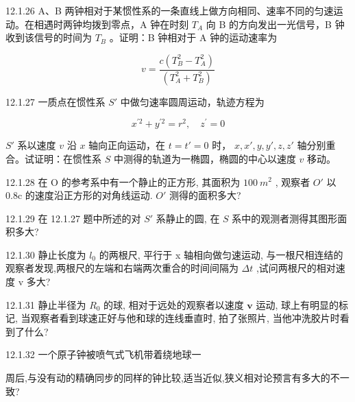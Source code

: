 \begin{problem}{12.1.26}
A、B 两钟相对于某惯性系的一条直线上做方向相同、速率不同的匀速运动。在相遇时两钟均拨到零点，A 钟在时刻 $T_{A}$ 向 B 的方向发出一光信号，B 钟收到该信号的时间为 $T_{B}$ 。证明：B 钟相对于 A 钟的运动速率为

\[
v = \frac {c (T _ {B} ^ {2} - T _ {A} ^ {2})}{(T _ {A} ^ {2} + T _ {B} ^ {2})}
\]
\end{problem}
\clearpage


\begin{problem}{12.1.27}
一质点在惯性系 $S'$ 中做匀速率圆周运动，轨迹方程为

\[
x ^ {\prime 2} + y ^ {\prime 2} = r ^ {2}, \quad z ^ {\prime} = 0
\]

$S'$ 系以速度 $v$ 沿 $x$ 轴向正向运动，在 $t = t' = 0$ 时， $x, x', y, y', z, z'$ 轴分别重合。试证明：在惯性系 $S$ 中测得的轨道为一椭圆，椭圆的中心以速度 $v$ 移动。
\end{problem}
\clearpage


\begin{problem}{12.1.28}
在 O 的参考系中有一个静止的正方形, 其面积为 $100 ~m^{2}$ , 观察者 $O'$ 以 0.8c 的速度沿正方形的对角线运动. $O'$ 测得的面积多大?
\end{problem}
\clearpage


\begin{problem}{12.1.29}
在 12.1.27 题中所述的对 $S'$ 系静止的圆, 在 $S$ 系中的观测者测得其图形面积多大?
\end{problem}
\clearpage


\begin{problem}{12.1.30}
静止长度为 $l_{0}$ 的两根尺, 平行于 x 轴相向做匀速运动, 与一根尺相连结的观察者发现,两根尺的左端和右端两次重合的时间间隔为 $\Delta t$ ,试问两根尺的相对速度 v 多大?
\begin{center}

\end{center}
\end{problem}
\clearpage


\begin{problem}{12.1.31}
静止半径为 $R_0$ 的球, 相对于远处的观察者以速度 $\bm{v}$ 运动, 球上有明显的标记, 当观察者看到球速正好与他和球的连线垂直时, 拍了张照片, 当他冲洗胶片时看到了什么?
\end{problem}
\clearpage


\begin{problem}{12.1.32}
一个原子钟被喷气式飞机带着绕地球一

周后,与没有动的精确同步的同样的钟比较,适当近似,狭义相对论预言有多大的不一致?
\end{problem}
\clearpage


